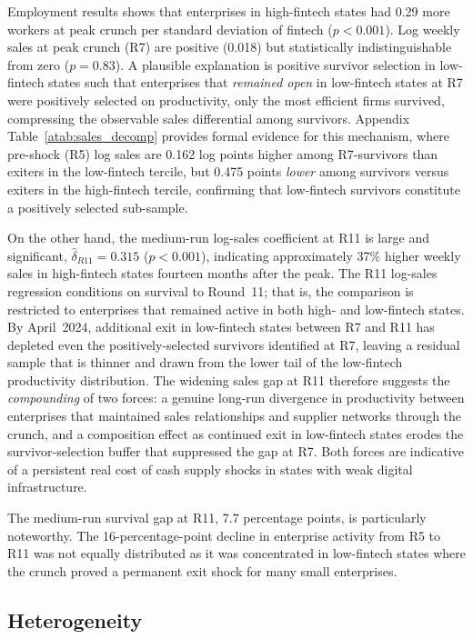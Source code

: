 Employment results shows that enterprises in high-fintech states
had 0.29 more workers at peak crunch per standard deviation of fintech
($p < 0.001$). Log weekly sales at peak crunch (R7) are positive (0.018) but
statistically indistinguishable from zero ($p = 0.83$). A plausible
explanation is positive survivor selection in low-fintech states such that enterprises
that \emph{remained open} in low-fintech states at R7 were positively selected
on productivity, only the most efficient firms survived, compressing the
observable sales differential among survivors. Appendix
Table~\ref{atab:sales_decomp} provides formal evidence for this mechanism, where
pre-shock (R5) log sales are 0.162 log points higher among R7-survivors than
exiters in the low-fintech tercile, but 0.475 points \emph{lower} among
survivors versus exiters in the high-fintech tercile, confirming that
low-fintech survivors constitute a positively selected sub-sample.

On the other hand, the medium-run log-sales coefficient at R11 is large and
significant, $\hat\delta_{R11} = 0.315$ ($p < 0.001$), indicating
approximately 37\% higher weekly sales in high-fintech states fourteen months
after the peak. The R11 log-sales regression conditions on survival to
Round~11; that is, the comparison is restricted to enterprises that remained
active in both high- and low-fintech states. By April~2024, additional exit in
low-fintech states between R7 and R11 has depleted even the positively-selected
survivors identified at R7, leaving a residual sample that is thinner and
drawn from the lower tail of the low-fintech productivity distribution. The
widening sales gap at R11 therefore suggests the \emph{compounding} of two
forces: a genuine long-run divergence in productivity between enterprises that
maintained sales relationships and supplier networks through the crunch, and a
composition effect as continued exit in low-fintech states erodes the
survivor-selection buffer that suppressed the gap at R7. Both forces are indicative of a
persistent real cost of cash supply shocks in states with weak digital
infrastructure.

The medium-run survival gap at R11, 7.7 percentage points, is particularly noteworthy. 
The 16-percentage-point decline in enterprise activity from R5 to
R11 was not equally distributed as it was concentrated in low-fintech states
where the crunch proved a permanent exit shock for many small enterprises.

\subsection{Heterogeneity}
\label{sub:heterogeneity}

